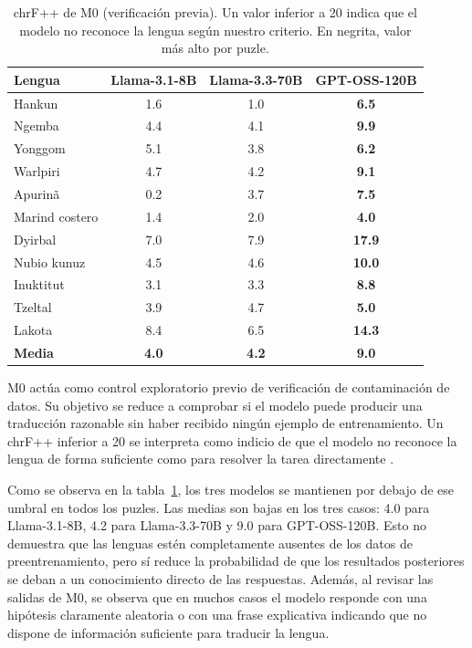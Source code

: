 \begin{table}[H]
	\centering
	\caption{chrF++ de M0 (verificación previa). Un valor inferior a 20 indica que el modelo no reconoce la lengua según nuestro criterio. En negrita, valor más alto por puzle.}
	\label{tab:m0-verificacion}
	{\fontsize{10.5pt}{12pt}\selectfont
		\begin{tabular*}{1.00\textwidth}{@{\extracolsep{\fill}} lccc}
			\toprule
			\textbf{Lengua} & \textbf{Llama-3.1-8B} & \textbf{Llama-3.3-70B} & \textbf{GPT-OSS-120B} \\
			\midrule
			Hankun & 1.6 & 1.0 & \textbf{6.5} \\
			Ngemba & 4.4 & 4.1 & \textbf{9.9} \\
			Yonggom & 5.1 & 3.8 & \textbf{6.2} \\
			Warlpiri & 4.7 & 4.2 & \textbf{9.1} \\
			Apurinã & 0.2 & 3.7 & \textbf{7.5} \\
			Marind costero & 1.4 & 2.0 & \textbf{4.0} \\
			Dyirbal & 7.0 & 7.9 & \textbf{17.9} \\
			Nubio kunuz & 4.5 & 4.6 & \textbf{10.0} \\
			Inuktitut & 3.1 & 3.3 & \textbf{8.8} \\
			Tzeltal & 3.9 & 4.7 & \textbf{5.0} \\
			Lakota & 8.4 & 6.5 & \textbf{14.3} \\
			\midrule
			\textbf{Media} & \textbf{4.0} & \textbf{4.2} & \textbf{9.0} \\
			\bottomrule
		\end{tabular*}
	}
\end{table}

M0 actúa como control exploratorio previo de verificación de contaminación de datos. Su objetivo se reduce a comprobar si el modelo puede producir una traducción razonable sin haber recibido ningún ejemplo de entrenamiento. Un chrF++ inferior a 20 se interpreta como indicio de que el modelo no reconoce la lengua de forma suficiente como para resolver la tarea directamente \citep{sanchez2024linguini}.

Como se observa en la tabla~\ref{tab:m0-verificacion}, los tres modelos se mantienen por debajo de ese umbral en todos los puzles. Las medias son bajas en los tres casos: 4.0 para Llama-3.1-8B, 4.2 para Llama-3.3-70B y 9.0 para GPT-OSS-120B. Esto no demuestra que las lenguas estén completamente ausentes de los datos de preentrenamiento, pero sí reduce la probabilidad de que los resultados posteriores se deban a un conocimiento directo de las respuestas. Además, al revisar las salidas de M0, se observa que en muchos casos el modelo responde con una hipótesis claramente aleatoria o con una frase explicativa indicando que no dispone de información suficiente para traducir la lengua.


